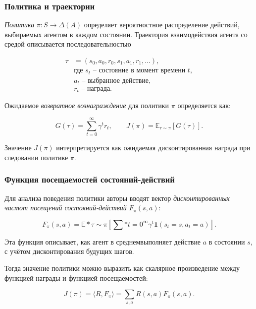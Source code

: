 \subsubsection{Политика и траектории}

\emph{Политика} $\pi : S \to \Delta(A)$ определяет вероятностное распределение действий, выбираемых агентом в каждом состоянии.
Траектория взаимодействия агента со средой описывается последовательностью

\begin{equation}
\begin{aligned}
    \tau &= (s_0, a_0, r_0, s_1, a_1, r_1, \ldots), \\
    &\text{где } s_t\text{~-- состояние в момент времени } t, \\
    &a_t\text{~-- выбранное действие,} \\
    &r_t\text{~-- награда.}
\end{aligned}
\end{equation}

Ожидаемое \emph{возвратное вознаграждение} для политики $\pi$ определяется как:

\begin{equation}
G(\tau) = \sum_{t=0}^{\infty} \gamma^t r_t, \qquad J(\pi) = \mathbb{E}_{\tau \sim \pi}[G(\tau)].
\end{equation}

Значение $J(\pi)$ интерпретируется как ожидаемая дисконтированная награда при следовании политике $\pi$.


\subsubsection{Функция посещаемостей состояний-действий}

Для анализа поведения политики авторы вводят вектор \emph{дисконтированных частот посещений состояний-действий} $F_\pi(s,a)$:

\begin{equation}
F_\pi(s,a) = \mathbb{E}*{\tau \sim \pi}\left[ \sum*{t=0}^{\infty} \gamma^t \mathbf{1}(s_t = s, a_t = a) \right].
\end{equation}

Эта функция описывает, как агент в среднемвыполняет действие $a$ в состоянии $s$,
с учётом дисконтирования будущих шагов.

Тогда значение политики можно выразить как скалярное произведение между функцией награды и функцией посещаемостей:

\begin{equation}
J(\pi) = \langle R, F_\pi \rangle = \sum_{s,a} R(s,a) F_\pi(s,a).
\end{equation}

